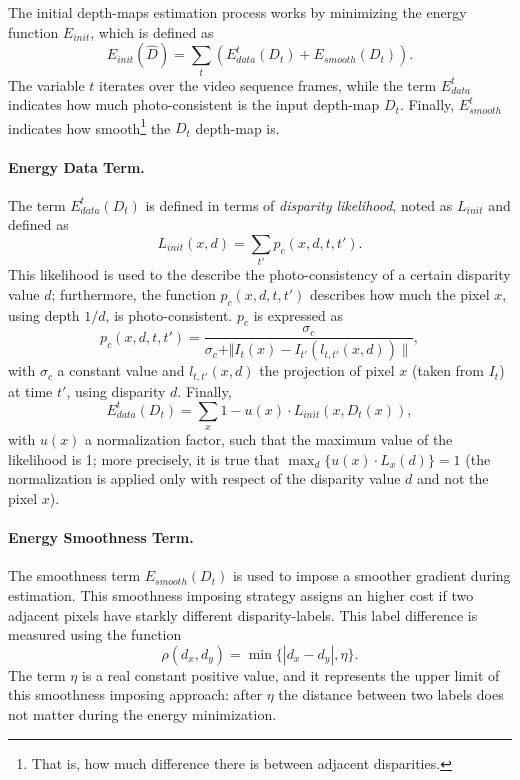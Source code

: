 \documentclass[notitlepage,english]{hgbreport}
\begin{document}

The initial depth-maps estimation process works by minimizing the energy function $E_{init}$, which is defined as
\begin{equation}
\label{eq:init_energy}
E_{init}(\hat D) = \sum_{t} \left(E_{data}^t(D_t) + E_{smooth}(D_t)\right).
\end{equation}
The variable $t$ iterates over the video sequence frames, while the term $E^t_{data}$ indicates how much photo-consistent is the input depth-map $D_t$. Finally, $E_{smooth}^t$ indicates how smooth\footnote{That is, how much difference there is between adjacent disparities.} the $D_t$ depth-map is.

\paragraph{Energy Data Term.}
The term $E_{data}^t(D_t)$ is defined in terms of \emph{disparity likelihood}, noted as $L_{init}$ and defined as
$$L_{init}(x, d) = \sum_{t'} p_c(x,d,t,t').$$
This likelihood is used to the describe the photo-consistency of a certain disparity value $d$; furthermore, the function $p_c(x,d,t,t')$ describes how much the pixel $x$, using depth $1/d$, is photo-consistent. $p_c$ is expressed as
$$p_c(x,d,t,t') = \frac{\sigma_c}{\sigma_c + \Vert I_t(x) - I_{t'}(l_{t,t'}(x,d))\rVert},$$
with $\sigma_c$ a constant value and $l_{t,t'}(x,d)$ the projection of pixel $x$ (taken from $I_t$) at time $t'$, using disparity $d$.
Finally, 
\begin{equation}\label{eq:init_energy_data}
E_{data}^t(D_t) = \sum_{x}1 -  u(x) \cdot L_{init}(x,D_t(x)),
\end{equation}
with $u(x)$ a normalization factor, such that the maximum value of the likelihood is 1; more precisely, it is true that $\max_{d} \{u(x)\cdot L_x(d)\} = 1$ (\ie the normalization is applied only with respect of the disparity value $d$ and not the pixel $x$).

\paragraph{Energy Smoothness Term.}
The smoothness term $E_{smooth}(D_t)$ is used to impose a smoother gradient during estimation.
This smoothness imposing strategy assigns an higher cost if two adjacent pixels have starkly different disparity-labels.
This label difference is measured using the function
$$\rho(d_x,d_y) = \min\{|d_x-d_y|, \eta\}.$$
The term $\eta$ is a real constant positive value, and it represents the upper limit of this smoothness imposing approach: after $\eta$ the distance between two labels does not matter during the energy minimization.
\end{document}
